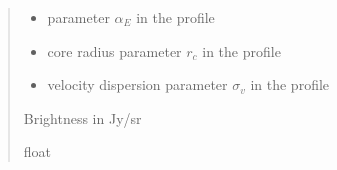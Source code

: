 \documentclass[letterpaper,10pt,english]{sphinxmanual}
\begin{document}
\begin{fulllineitems}
\begin{quote}
\begin{description}
\begin{itemize}
\item {} 
\sphinxAtStartPar
{} \textendash{} parameter \(\alpha_E\) in the {\hyperref[\detokenize{diffsph.profiles:diffsph.profiles.templates.enst}]{}} profile

\item {} 
\sphinxAtStartPar
{} \textendash{} core radius parameter \(r_c\) in the {\hyperref[\detokenize{diffsph.profiles:diffsph.profiles.templates.cnfw}]{}} profile

\item {} 
\sphinxAtStartPar
{} \textendash{} velocity dispersion parameter \(\sigma_v\) in the {\hyperref[\detokenize{diffsph.profiles:diffsph.profiles.templates.sis}]{}} profile

\end{itemize}

\sphinxAtStartPar
Brightness in Jy/sr

\sphinxAtStartPar
float

\end{description}\end{quote}

\end{fulllineitems}

\end{document}
